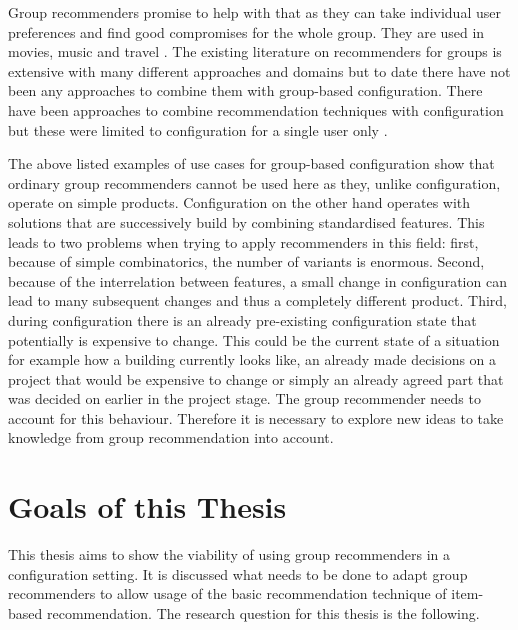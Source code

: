 Group recommenders promise to help with that as they can take individual user preferences and find good compromises for the whole group. They are used in movies, music and travel \cite{garciaGroupRecommenderSystem2009, piliponyte2013sequential, peraGroupRecommenderMovies2013,felfernigGroupRecommenderApplications2018}. The existing literature on recommenders for groups is extensive with many different approaches and domains \cite{delicResearchMethodsGroup2016, chenInterfaceInteractionDesign2011, atasItemRecommendationUsing2017, jamesonRecommendationGroups2007, chenEmpatheticonsDesigningEmotion2014, liuCGSPAComprehensiveGroup2019} but to date there have not been any approaches to combine them with group-based configuration. There have been approaches to combine recommendation techniques with configuration but these were limited to configuration for a single user only \cite{pereiraFeatureBasedPersonalizedRecommender2016, scholzConfigurationbasedRecommenderSystem2017, scholzEffectsDecisionSpace2017}.


The above listed examples of use cases for group-based configuration show that ordinary group recommenders cannot be used here as they, unlike configuration, operate on simple products. Configuration on the other hand operates with solutions that are successively build by combining standardised features. This leads to two problems when trying to apply recommenders in this field: first, because of simple combinatorics, the number of variants is enormous. Second, because of the interrelation between features, a small change in configuration can lead to many subsequent changes and thus a completely different product. Third, during configuration there is an already pre-existing configuration state that potentially is expensive to change. This could be the current state of a situation for example how a building currently looks like, an already made decisions on a project that would be expensive to change or simply an already agreed part that was decided on earlier in the project stage. The group recommender needs to account for this behaviour. Therefore it is necessary to explore new ideas to take knowledge from group recommendation into account.

\section{Goals of this Thesis}
\label{sec:Introduction:Goals}

This thesis aims to show the viability of using group recommenders in a configuration setting. It is discussed what needs to be done to adapt group recommenders to allow usage of the basic recommendation technique of item-based recommendation. The research question for this thesis is the following.


